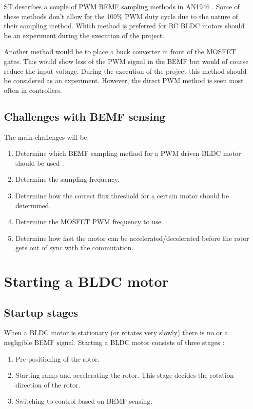 \documentclass[]{report}
\begin{document}
ST describes a couple of PWM BEMF sampling methods in AN1946 \cite{ST_PWM_BEMF_sampling}. Some of these methods don't allow for the 100\% PWM duty cycle due to the nature of their sampling method. Which method is preferred for RC BLDC motors should be an experiment during the execution of the project.

Another method would be to place a buck converter in front of the MOSFET gates. This would show less of the PWM signal in the BEMF but would of course reduce the input voltage. During the execution of the project this method should be considered as an experiment. However, the direct PWM method is seen most often in controllers.

\subsection{Challenges with BEMF sensing}
The main challenges will be:
\begin{enumerate}
	\item Determine which BEMF sampling method for a PWM driven BLDC motor should be used \cite{ST_PWM_BEMF_sampling}.
	\item Determine the sampling frequency.
	\item Determine how the correct flux threshold for a certain motor should be determined.
	\item Determine the MOSFET PWM frequency to use.
	\item Determine how fast the motor can be accelerated/decelerated before the rotor gets out of sync with the commutation.
\end{enumerate}

\section{Starting a BLDC motor}
\subsection{Startup stages}
When a BLDC motor is stationary (or rotates very slowly) there is no or a negligible BEMF signal. Starting a BLDC motor consists of three stages \cite{ST_Starting_Sequence_BLDC}:
\begin{enumerate}
	\item Pre-positioning of the rotor.
	\item Starting ramp and accelerating the rotor. This stage decides the rotation direction of the rotor.
	\item Switching to control based on BEMF sensing.
\end{enumerate}
\end{document}
